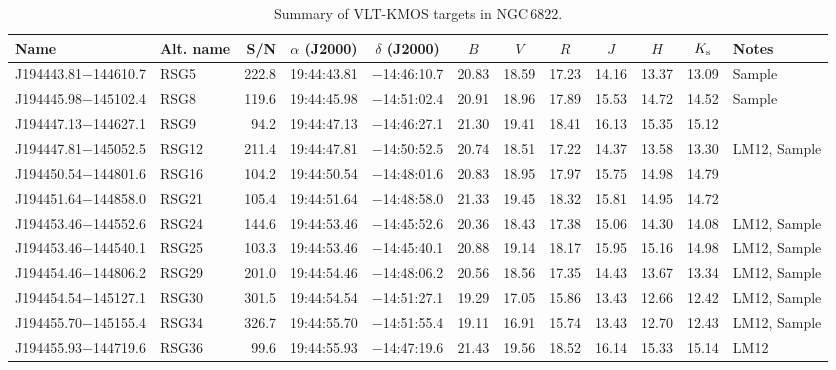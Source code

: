 \documentclass[iop]{emulateapj}
\begin{document}
\begin{table*}
\caption{
        Summary of VLT-KMOS targets in NGC\,6822.\label{tb:obs-params}
        }
\scriptsize
\begin{center}
\begin{tabular}{llrccccccccl}
 \hline
 \hline
Name & Alt. name & S/N & $\alpha$ (J2000) & $\delta$ (J2000) & $B$ & $V$ & $R$ & $J$ & $H$ & $K_{\rm s}$ & Notes \\
 \hline
J194443.81$-$144610.7  &  RSG5   & 222.8 &   19:44:43.81  &  $-$14:46:10.7  &  20.83  &  18.59  &  17.23  &  14.16  &  13.37  &  13.09 & Sample\\
J194445.98$-$145102.4  &  RSG8   & 119.6 &   19:44:45.98  &  $-$14:51:02.4  &  20.91  &  18.96  &  17.89  &  15.53  &  14.72  &  14.52 & Sample\\
J194447.13$-$144627.1  &  RSG9   &  94.2 &   19:44:47.13  &  $-$14:46:27.1  &  21.30  &  19.41  &  18.41  &  16.13  &  15.35  &  15.12 \\
J194447.81$-$145052.5  &  RSG12  & 211.4 &   19:44:47.81  &  $-$14:50:52.5  &  20.74  &  18.51  &  17.22  &  14.37  &  13.58  &  13.30 & LM12, Sample \\
J194450.54$-$144801.6  &  RSG16  & 104.2 &   19:44:50.54  &  $-$14:48:01.6  &  20.83  &  18.95  &  17.97  &  15.75  &  14.98  &  14.79 \\
J194451.64$-$144858.0  &  RSG21  & 105.4 &   19:44:51.64  &  $-$14:48:58.0  &  21.33  &  19.45  &  18.32  &  15.81  &  14.95  &  14.72 \\
J194453.46$-$144552.6  &  RSG24  & 144.6 &   19:44:53.46  &  $-$14:45:52.6  &  20.36  &  18.43  &  17.38  &  15.06  &  14.30  &  14.08 & LM12, Sample \\
J194453.46$-$144540.1  &  RSG25  & 103.3 &   19:44:53.46  &  $-$14:45:40.1  &  20.88  &  19.14  &  18.17  &  15.95  &  15.16  &  14.98 & LM12, Sample \\
J194454.46$-$144806.2  &  RSG29  & 201.0 &   19:44:54.46  &  $-$14:48:06.2  &  20.56  &  18.56  &  17.35  &  14.43  &  13.67  &  13.34 & LM12, Sample\\
J194454.54$-$145127.1  &  RSG30  & 301.5 &   19:44:54.54  &  $-$14:51:27.1  &  19.29  &  17.05  &  15.86  &  13.43  &  12.66  &  12.42 & LM12, Sample \\
J194455.70$-$145155.4  &  RSG34  & 326.7 &   19:44:55.70  &  $-$14:51:55.4  &  19.11  &  16.91  &  15.74  &  13.43  &  12.70  &  12.43 & LM12, Sample \\
J194455.93$-$144719.6  &  RSG36  &  99.6 &   19:44:55.93  &  $-$14:47:19.6  &  21.43  &  19.56  &  18.52  &  16.14  &  15.33  &  15.14 & LM12 \\

\end{tabular}
\end{center}
\end{table*}
\end{document}
